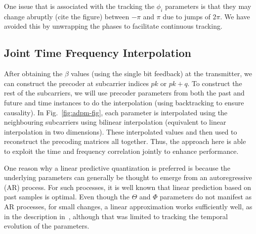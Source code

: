 \documentclass[conference]{IEEEtran}
\begin{document}
One issue that is associated with the tracking the $\phi_i$ parameters
is that they may change abruptly (cite the figure) between $-\pi$ and
$\pi$ due to jumps of $2\pi$. We have avoided this by unwrapping the
phases to facilitate continuous tracking.
\subsection{Joint Time Frequency Interpolation}
\label{interp}
After obtaining the $\beta$ values (using the single bit feedback) at
the transmitter, we can construct the precoder at subcarrier indices
$pk$ or $pk+q$. To construct the rest of the subcarriers, we will use
precoder parameters from both the past and future and time instances
to do the interpolation (using backtracking to ensure causality). In
Fig.~\ref{fig:adpm-fig}, each parameter is interpolated using the
neighbouring subcarriers using bilinear interpolation (equivalent to
linear interpolation in two dimensions). These interpolated values and
then used to reconstruct the precoding matrices all together. Thus,
the approach here is able to exploit the time and frequency
correlation jointly to enhance performance.

One reason why a linear predictive quantization is preferred is
because the underlying parameters can generally be thought to emerge
from an autoregressive (AR) process. For such processes, it is well known
that linear prediction based on past samples is optimal. Even though
the $\Theta$ and $\Phi$ parameters do not manifest as AR processes,
for small changes, a linear approximation works sufficiently
well, as in the description in~\cite{4114278}, although that was
limited to tracking the temporal evolution of the parameters.
\end{document}
